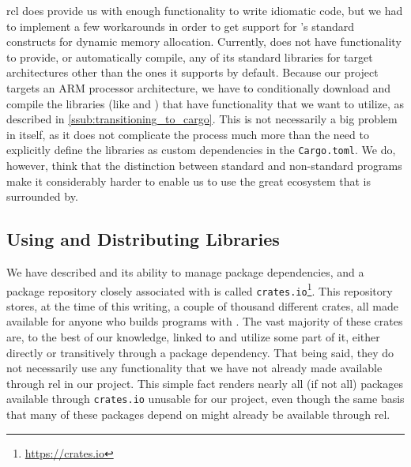 \gls{rcl} does provide us with enough functionality to write idiomatic {\rust} code, but we had to implement a few workarounds in order to get support for {\rust}'s standard constructs for dynamic memory allocation.
Currently, {\rust} does not have functionality to provide, or automatically compile, any of its standard libraries for target architectures other than the ones it supports by default.
Because our project targets an ARM processor architecture, we have to conditionally download and compile the libraries (like  and ) that have functionality that we want to utilize, as described in \autoref{ssub:transitioning_to_cargo}.
This is not necessarily a big problem in itself, as it does not complicate the process much more than the need to explicitly define the libraries as custom dependencies in the \texttt{Cargo.toml}.
We do, however, think that the distinction between standard and non-standard programs make it considerably harder to enable us to use the great ecosystem that {\rust} is surrounded by.

\subsection{Using and Distributing Libraries}

We have described {\cargo} and its ability to manage package dependencies, and a package repository closely associated with {\cargo} is called \texttt{crates.io}\footnote{\url{https://crates.io}}.
This repository stores, at the time of this writing, a couple of thousand different {\rust} crates, all made available for anyone who builds {\rust} programs with {\cargo}.
The vast majority of these crates are, to the best of our knowledge, linked to {\std} and utilize some part of it, either directly or transitively through a package dependency.
That being said, they do not necessarily use any functionality that we have not already made available through \gls{rel} in our project.
This simple fact renders nearly all (if not all) packages available through \texttt{crates.io} unusable for our project, even though the same basis that many of these packages depend on might already be available through \gls{rel}.

